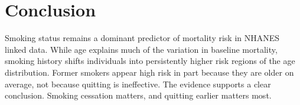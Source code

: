 \documentclass[12pt]{article}
\begin{document}
\section{Conclusion}

Smoking status remains a dominant predictor of mortality risk in NHANES linked data. While age explains much of the variation in baseline mortality, smoking history shifts individuals into persistently higher risk regions of the age distribution. Former smokers appear high risk in part because they are older on average, not because quitting is ineffective. The evidence supports a clear conclusion. Smoking cessation matters, and quitting earlier matters most.
\end{document}
